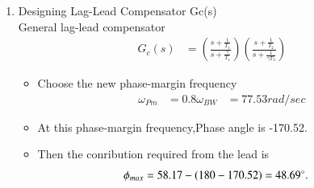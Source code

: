 \begin{enumerate}[label=\thesubsection.\arabic*.,ref=\thesubsection.\theenumi]
\begin{align}
\implies \phi_{m} &= 53.17\degree
\end{align}
For an additional 5\degree for lag compensation,Phase margin is
\begin{align}
    \phi_{m} &= 53.17\degree + 5\degree= 58.17\degree
\end{align}
\textbf{Note} : Adding 5\degree phase angle to compensate the phase angle contribution of the lag compensator.
Bandwidth frequency is given by
\begin{align}
\omega_{BW} &= \omega_{n}(\sqrt{(1-2\zeta^2)+\sqrt{4\zeta^4-4\zeta^2+2}})
\end{align}
where
\begin{align}
    \omega_{n} &= \frac{4}{T_{s}\zeta}
\end{align}
Given settling time = 0.1 sec then 
\begin{align}
    \omega_{n} &= 77.37 rad/sec 
\end{align}
then
\begin{align}
    \omega_{BW} &= 96.91 rad/sec
\end{align}
\item Designing Lag-Lead Compensator Gc(s) \\
\solution 
General lag-lead compensator 
\begin{align}
G_{c}(s) &= \left(\frac{s+\frac{1}{T_1}}{s+\frac{\gamma}{T_1}}\right)\left(\frac{s+\frac{1}{T_2}}{s+\frac{1}{\gamma T_2}}\right) 
\end{align}
\begin{itemize}
\item Choose the new phase-margin frequency 
\begin{align}
    \omega_{Pm} &= 0.8 \omega_{BW} &= 77.53 rad/sec
\end{align}
\item At this phase-margin frequency,Phase angle is -170.52\degree.
\item Then the conribution required from the lead is
\begin{align}
    \phi_{max} &= 58.17-(180-170.52)=48.69\degree.
\end{align}


\end{itemize}
\end{enumerate}
